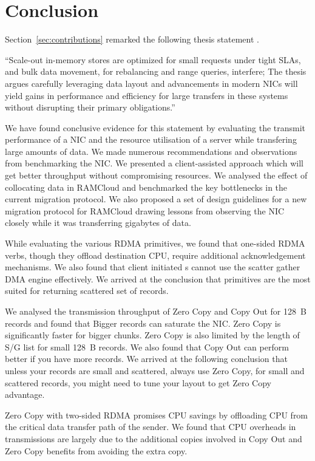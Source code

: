 
\chapter{Conclusion}
\label{chap:conclusion}
Section~\ref{sec:contributions} remarked the following thesis statement .

``Scale-out in-memory stores are optimized for small requests
under tight SLAs, and bulk data movement, for rebalancing and range queries, interfere;
The thesis argues \linebreak carefully leveraging data layout and advancements in modern NICs
will yield gains in performance and efficiency for large transfers in these systems
without disrupting their primary obligations.''
 

We have found conclusive evidence for this statement by evaluating the transmit performance 
of a NIC and the resource utilisation of a server while transfering large amounts of data. We 
made numerous recommendations and observations from benchmarking the NIC. We presented a client-assisted 
approach which will get better throughput without compromising resources. We analysed the effect of collocating
data in RAMCloud and benchmarked the key bottlenecks in the current migration protocol. We also proposed a set of design 
guidelines for a new migration protocol for RAMCloud drawing lessons from observing the NIC closely while it was 
transferring gigabytes of data. 

While evaluating the various RDMA primitives, we found that one-sided RDMA verbs, though they offload destination CPU, 
require additional acknowledgement mechanisms. We also found that client initiated s cannot use the 
scatter gather DMA engine effectively. We arrived at the conclusion that  primitives 
are the most suited for returning scattered set of records.

We analysed the transmission throughput of Zero Copy and Copy Out for 128~B records and found that Bigger records can saturate the NIC.
Zero Copy is significantly faster for bigger chunks. Zero Copy is also limited by the length of S/G list for small 128~B records.
We also found that Copy Out can perform better if you have more records. We arrived at the following conclusion that 
unless your records are small and scattered, always use Zero Copy, for small and scattered records, you might need to tune your layout 
to get Zero Copy advantage.

Zero Copy with two-sided RDMA promises CPU savings by offloading CPU from the critical data transfer path of the sender. We found that 
CPU overheads in transmissions are largely due to the additional copies involved in Copy Out and Zero Copy benefits from avoiding the extra copy.
 

